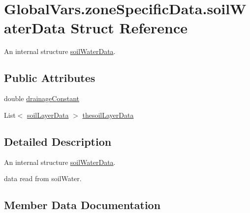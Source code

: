 \hypertarget{struct_global_vars_1_1zone_specific_data_1_1soil_water_data}{}\section{Global\+Vars.\+zone\+Specific\+Data.\+soil\+Water\+Data Struct Reference}
\label{struct_global_vars_1_1zone_specific_data_1_1soil_water_data}


An internal structure \mbox{\hyperlink{struct_global_vars_1_1zone_specific_data_1_1soil_water_data}{soil\+Water\+Data}}.  


\subsection*{Public Attributes}
\begin{DoxyCompactItemize}
\item 
double \mbox{\hyperlink{struct_global_vars_1_1zone_specific_data_1_1soil_water_data_a7fe5c99bc76b68b06a424bf37f055d62}{drainage\+Constant}}
\item 
List$<$ \mbox{\hyperlink{struct_global_vars_1_1zone_specific_data_1_1soil_layer_data}{soil\+Layer\+Data}} $>$ \mbox{\hyperlink{struct_global_vars_1_1zone_specific_data_1_1soil_water_data_a0dd1174e86427d3c82c8c23021b55edf}{thesoil\+Layer\+Data}}
\end{DoxyCompactItemize}


\subsection{Detailed Description}
An internal structure \mbox{\hyperlink{struct_global_vars_1_1zone_specific_data_1_1soil_water_data}{soil\+Water\+Data}}. 

data read from soil\+Water. 

\subsection{Member Data Documentation}
\mbox{\label{struct_global_vars_1_1zone_specific_data_1_1soil_water_data_a7fe5c99bc76b68b06a424bf37f055d62}} 
